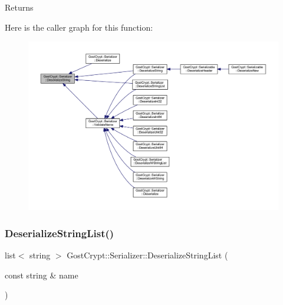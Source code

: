 \begin{DoxyReturn}{Returns}

\end{DoxyReturn}
Here is the caller graph for this function\+:
\nopagebreak
\begin{figure}[H]
\begin{center}
\leavevmode
\includegraphics[width=350pt]{class_gost_crypt_1_1_serializer_ae242985e8f3361a362ef2068768727e2_icgraph}
\end{center}
\end{figure}
\mbox{\label{class_gost_crypt_1_1_serializer_a9d973fc5d0ef82706491ca37e1946cba}} 
\subsubsection{\texorpdfstring{Deserialize\+String\+List()}{DeserializeStringList()}}
{\footnotesize\ttfamily list$<$ string $>$ Gost\+Crypt\+::\+Serializer\+::\+Deserialize\+String\+List (\begin{DoxyParamCaption}\item[{const string \&}]{name }\end{DoxyParamCaption})}


